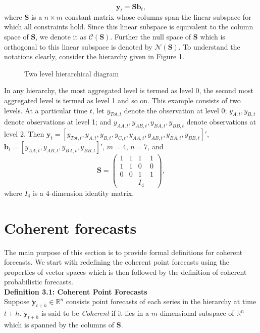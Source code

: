 \documentclass[a4paper, 11pt]{article}
\begin{document}
\begin{equation}
\mathbold{y}_t = \mathbold{Sb}_t,
\end{equation}
where $\mathbold{S}$ is a $n \times m$ constant matrix whose columns span the linear subspace for which all constraints hold. Since this linear subspace is equivalent to the column space of $\bm{S}$, we denote it as $\mathscr{C}(\bm{S})$. Further the null space of $\bm{S}$ which is orthogonal to this linear subspace is denoted by $\mathscr{N}(\bm{S})$. 
To understand the notations clearly, consider the hierarchy given in Figure 1.
\begin{figure}[H]
	\begin{center}
		  
		 
		\qobitree
	\end{center}
	\caption{Two level hierarchical diagram}
\end{figure}
\noindent
In any hierarchy, the most aggregated level is termed as level 0, the second most aggregated level is termed as level 1 and so on. This example consists of two levels. At a particular time $t$, let $y_{Tot,t}$ denote the observation at level 0; $y_{A,t}, y_{B,t} $ denote observations at level 1; and $y_{AA,t}, y_{AB,t}, y_{BA,t}, y_{BB,t}$ denote observations at level 2. Then $\mathbold{y}_t = [y_{Tot,t},y_{A,t}, y_{B,t},y_{C,t},y_{AA,t}, y_{AB,t}, y_{BA,t}, y_{BB,t}]'$, \\$\mathbold{b}_t = [y_{AA,t}, y_{AB,t}, y_{BA,t}, y_{BB,t}]'$, $m=4$, $n=7$, and $$ \mathbold{S} = \begin{pmatrix} 1& 1 &1 &1  \\ 1 &1 & 0 &0 \\   0&0  & 1 & 1 \\ & & I_4 &   \end{pmatrix}, $$ where $I_4$ is a $4$-dimension identity matrix. \\  


\section{Coherent forecasts}

The main purpose of this section is to provide formal definitions for coherent forecasts. We start with redefining the coherent point forecasts using the properties of vector spaces which is then followed by the definition of coherent probabilistic forecasts. 
\\

\noindent
\textbf{Definition 3.1: Coherent Point Forecasts}\\
\noindent
Suppose $\bm{\breve{y}}_{t+h} \in \mathbb{R}^n$ consists point forecasts of each series in the hierarchy at time $t+h$.  $\bm{\breve{y}}_{t+h}$ is said to be \textit{Coherent} if it lies in a $m$-dimensional subspace of $\bm{\mathbb{R}}^n$ which is spanned by the columns of $\bm{S}$. \\
\end{document}
